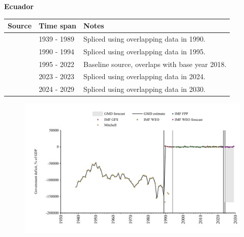 \documentclass[12pt,a4paper,landscape]{article}
\begin{document}
\begin{adjustbox}{max totalsize={\paperwidth}{\paperheight},center}
\begin{minipage}[t][\textheight][t]{\textwidth}
\vspace*{0.5cm}
{}
\begin{center}
{\Large\bfseries Ecuador}
\end{center}
\vspace{0.5cm}
\begin{table}[H]
\centering
\small
\begin{tabular}{|l|l|l|}
\hline
\textbf{Source} & \textbf{Time span} & \textbf{Notes} \\
\hline
\rowcolor{white}\cite{Mitchell}& 1939 - 1989 &Spliced using overlapping data in 1990.\\
\rowcolor{lightgray}\cite{IMF_GFS}& 1990 - 1994 &Spliced using overlapping data in 1995.\\
\rowcolor{white}\cite{IMF_WEO}& 1995 - 2022 &Baseline source, overlaps with base year 2018.\\
\rowcolor{lightgray}\cite{IMF_FPP}& 2023 - 2023 &Spliced using overlapping data in 2024.\\
\rowcolor{white}\cite{IMF_WEO_forecast}& 2024 - 2029 &Spliced using overlapping data in 2030.\\
\hline
\end{tabular}
\end{table}
\begin{figure}[H]
\centering
\includegraphics[width=\textwidth,height=0.6\textheight,keepaspectratio]{graphs/ECU_govdef_GDP.pdf}
\end{figure}
\end{minipage}
\end{adjustbox}
\end{document}
